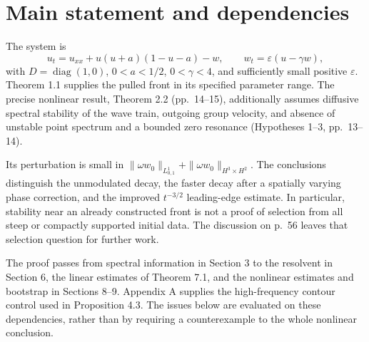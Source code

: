 \documentclass[10pt]{article}
\begin{document}
\section*{Main statement and dependencies}
The system is \[u_t=u_{xx}+u(u+a)(1-u-a)-w,\qquad
 w_t=\varepsilon(u-\gamma w),\] with \(D=\operatorname{diag}(1,0)\), \(0<a<1/2\), \(0<\gamma<4\), and sufficiently small positive \(\varepsilon\). Theorem 1.1 supplies the pulled front in its specified parameter range. The precise nonlinear result, Theorem 2.2 (pp. 14–15), additionally assumes diffusive spectral stability of the wave train, outgoing group velocity, and absence of unstable point spectrum and a bounded zero resonance (Hypotheses 1–3, pp. 13–14).\par
Its perturbation is small in \(\|\omega w_0\|_{L^1_{0,1}}+\|\omega w_0\|_{H^3\times H^2}\). The conclusions distinguish the unmodulated decay, the faster decay after a spatially varying phase correction, and the improved \(t^{-3/2}\) leading-edge estimate. In particular, stability near an already constructed front is not a proof of selection from all steep or compactly supported initial data. The discussion on p. 56 leaves that selection question for further work.\par
The proof passes from spectral information in Section 3 to the resolvent in Section 6, the linear estimates of Theorem 7.1, and the nonlinear estimates and bootstrap in Sections 8–9. Appendix A supplies the high-frequency contour control used in Proposition 4.3. The issues below are evaluated on these dependencies, rather than by requiring a counterexample to the whole nonlinear conclusion.\par
\end{document}
